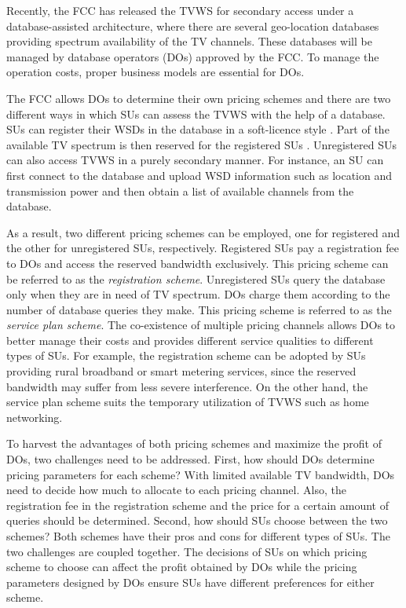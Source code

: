 \documentclass[journal]{IEEEtran}
\begin{document}
Recently, the FCC has released the TVWS for secondary access \cite{FCCrule10}\cite{FCCrule12} under a database-assisted architecture, where there are several geo-location databases providing spectrum availability of the TV channels. These databases will be managed by database operators (DOs) approved by the FCC. To manage the operation costs, proper business models are essential for DOs.

The FCC allows DOs to determine their own pricing schemes \cite{FCCrule10} and there are two different ways in which SUs can assess the TVWS with the help of a database. SUs can register their WSDs in the database in a soft-licence style \cite{crwoncom12}. Part of the available TV spectrum is then reserved for the registered SUs \cite{ReserveFCC}\cite{ReserveOfcom}. Unregistered SUs can also access TVWS in a purely secondary manner. For instance, an SU can first connect to the database and upload WSD information such as location and transmission power and then obtain a list of available channels from the database.

As a result, two different pricing schemes can be employed, one for registered and the other for unregistered SUs, respectively. Registered SUs pay a registration fee to DOs and access the reserved bandwidth exclusively. This pricing scheme can be referred to as the \emph{registration scheme}. Unregistered SUs query the database only when they are in need of TV spectrum. DOs charge them according to the number of database queries they make. This pricing scheme is referred to as the \emph{service plan scheme}. The co-existence of multiple pricing channels allows DOs to better manage their costs and provides different service qualities to different types of SUs. For example, the registration scheme can be adopted by SUs providing rural broadband or smart metering services, since the reserved bandwidth may suffer from less severe interference. On the other hand, the service plan scheme suits the temporary utilization of TVWS such as home networking.

To harvest the advantages of both pricing schemes and maximize the profit of DOs, two challenges need to be addressed. First, how should DOs determine pricing parameters for each scheme? With limited available TV bandwidth, DOs need to decide how much to allocate to each pricing channel. Also, the registration fee in the registration scheme and the price for a certain amount of queries should be determined. Second, how should SUs choose between the two schemes? Both schemes have their pros and cons for different types of SUs. The two challenges are coupled together. The decisions of SUs on which pricing scheme to choose can affect the profit obtained by DOs while the pricing parameters designed by DOs ensure SUs have different preferences for either scheme.
\end{document}
